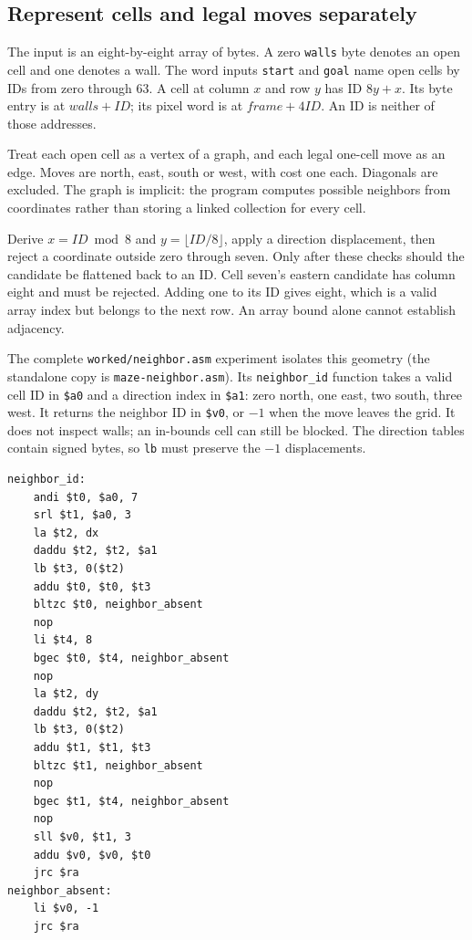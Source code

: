 \subsection*{Represent cells and legal moves separately}

The input is an eight-by-eight array of bytes. A zero \texttt{walls} byte denotes
an open cell and one denotes a wall. The word inputs \texttt{start} and
\texttt{goal} name open cells by IDs from zero through 63. A cell at column $x$
and row $y$ has ID $8y+x$. Its byte entry is at $walls+ID$; its pixel word is at
$frame+4ID$. An ID is neither of those addresses.

Treat each open cell as a vertex of a graph, and each legal one-cell move as an
edge. Moves are north, east, south or west, with cost one each. Diagonals are
excluded. The graph is implicit: the program computes possible neighbors from
coordinates rather than storing a linked collection for every cell.

Derive $x=ID\bmod8$ and $y=\lfloor ID/8\rfloor$, apply a direction displacement,
then reject a coordinate outside zero through seven. Only after these checks
should the candidate be flattened back to an ID. Cell seven's eastern candidate
has column eight and must be rejected. Adding one to its ID gives eight, which
is a valid array index but belongs to the next row. An array bound alone cannot
establish adjacency.

The complete \texttt{worked/neighbor.asm} experiment isolates this geometry
(the standalone copy is \texttt{maze-neighbor.asm}). Its
\texttt{neighbor\_id} function takes a valid cell ID in \texttt{\$a0} and a
direction index in \texttt{\$a1}: zero north, one east, two south, three west.
It returns the neighbor ID in \texttt{\$v0}, or $-1$ when the move leaves the grid.
It does not inspect walls; an in-bounds cell can still be blocked. The direction
tables contain signed bytes, so \texttt{lb} must preserve the $-1$ displacements.

\noindent\begin{minipage}{\linewidth}
  \begin{verbatim}
neighbor_id:
    andi $t0, $a0, 7
    srl $t1, $a0, 3
    la $t2, dx
    daddu $t2, $t2, $a1
    lb $t3, 0($t2)
    addu $t0, $t0, $t3
    bltzc $t0, neighbor_absent
    nop
    li $t4, 8
    bgec $t0, $t4, neighbor_absent
    nop
    la $t2, dy
    daddu $t2, $t2, $a1
    lb $t3, 0($t2)
    addu $t1, $t1, $t3
    bltzc $t1, neighbor_absent
    nop
    bgec $t1, $t4, neighbor_absent
    nop
    sll $v0, $t1, 3
    addu $v0, $v0, $t0
    jrc $ra
neighbor_absent:
    li $v0, -1
    jrc $ra
\end{verbatim}
\end{minipage}

